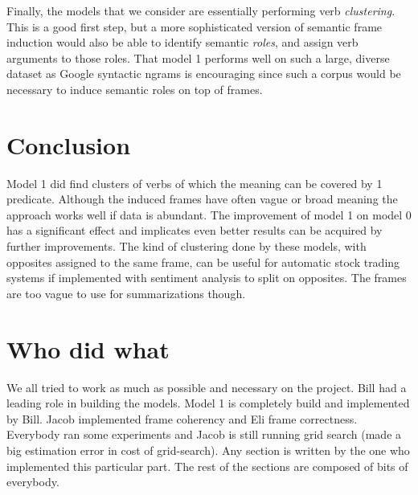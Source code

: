\documentclass{article} %
\begin{document}
Finally, the models that we consider are essentially performing verb \emph{clustering}.
This is a good first step, but a more sophisticated version of semantic frame induction
would also be able to identify semantic \emph{roles}, and assign verb arguments to those
roles. 
That model 1 performs well on such a large, diverse dataset as Google syntactic ngrams is
encouraging since such a corpus would be necessary to induce semantic roles on top of frames.  


\section{Conclusion}
Model 1 did find clusters of verbs of which the meaning can be covered by 1 predicate. Although the induced frames have often vague or broad meaning the approach works well if data is abundant. The improvement of model 1 on model 0 has a significant effect and implicates even better results can be acquired by further improvements. The kind of clustering done by these models, with opposites assigned to the same frame, can be useful for automatic stock trading systems if implemented with sentiment analysis to split on opposites. The frames are too vague to use for summarizations though.

\section*{Who did what}
We all tried to work as much as possible and necessary on the project. Bill had a leading role in building the models. Model 1 is completely build and implemented by Bill. Jacob implemented frame coherency and Eli frame correctness. Everybody ran some experiments and Jacob is still running grid search (made a big estimation error in cost of grid-search). Any section is written by the one who implemented this particular part. The rest of the sections are composed of bits of everybody. 


\end{document}
